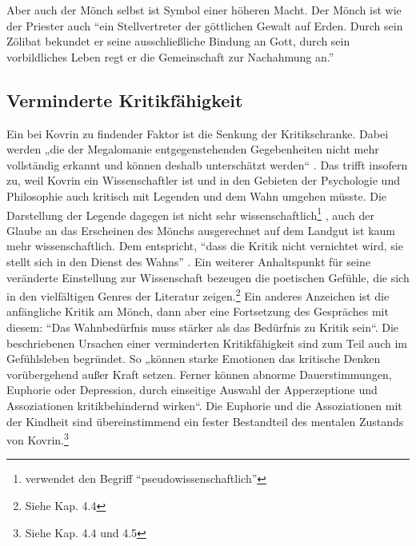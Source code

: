 \documentclass{../../sem_paper}
\begin{document}
Aber auch der Mönch selbst ist Symbol einer höheren Macht. Der Mönch ist wie der Priester auch
``ein Stellvertreter der göttlichen Gewalt auf Erden. Durch sein Zölibat bekundet er seine
ausschließliche Bindung an Gott, durch sein vorbildliches Leben regt er die Gemeinschaft zur
Nachahmung an.''\autocite[248]{brittnacher}
\subsection{Verminderte Kritikfähigkeit}
Ein bei Kovrin zu findender Faktor ist die Senkung der Kritikschranke. Dabei werden „die der
Megalomanie entgegenstehenden Gegebenheiten nicht mehr vollständig erkannt und können
deshalb unterschätzt werden“\autocite[85]{avenarius} . Das trifft insofern zu, weil Kovrin ein Wissenschaftler ist und in
den Gebieten der Psychologie und Philosophie auch kritisch mit Legenden und dem Wahn umgehen
müsste. Die Darstellung der Legende dagegen ist nicht sehr wissenschaftlich\footnote{\autocite{kluge}
verwendet den Begriff ``pseudowissenschaftlich''
} , auch der Glaube an
das Erscheinen des Mönchs ausgerechnet auf dem Landgut ist kaum mehr wissenschaftlich. Dem
entspricht, ``dass die Kritik nicht vernichtet wird, sie stellt 
sich in den Dienst des Wahns''\autocite{avenarius}
. Ein
weiterer Anhaltspunkt für seine veränderte Einstellung zur Wissenschaft bezeugen die poetischen
Gefühle, die sich in den vielfältigen Genres der Literatur zeigen.\footnote{Siehe Kap. 4.4} Ein anderes Anzeichen ist die
anfängliche Kritik am Mönch, dann aber eine Fortsetzung des Gespräches mit diesem: “Das
Wahnbedürfnis muss stärker als das Bedürfnis zu Kritik sein“\autocite[59]{avenarius}. Die beschriebenen Ursachen einer
verminderten Kritikfähigkeit sind zum Teil auch im Gefühlsleben begründet. So „können starke
Emotionen das kritische Denken vorübergehend außer Kraft setzen. Ferner können abnorme
Dauerstimmungen, Euphorie oder Depression, durch einseitige Auswahl der Apperzeptione und
Assoziationen kritikbehindernd wirken“\autocite[63]{avenarius}. Die Euphorie und die Assoziationen mit der Kindheit
sind übereinstimmend ein fester Bestandteil des mentalen Zustands von Kovrin.\footnote{Siehe Kap. 4.4 und 4.5}
\end{document}
